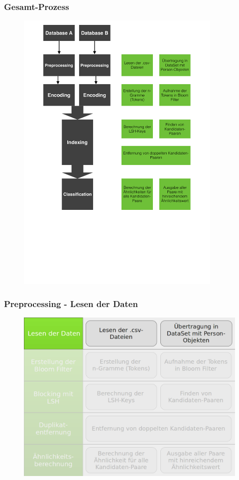 \documentclass{beamer}
\begin{document}
    \begin{frame}
    		\frametitle{Gesamt-Prozess}
    		\begin{figure}[H]
    			\includegraphics[height=14cm]{graphics/pprl.pdf}
    		\end{figure}
    \end{frame}
    
    \begin{frame}
    		\frametitle{Preprocessing - Lesen der Daten}
    		\begin{figure}[H]
    			\includegraphics[width=\textwidth]{graphics/process_1.png}
    		\end{figure}
    \end{frame}
    
\end{document}
